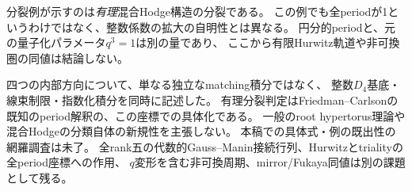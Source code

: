 分裂例が示すのは\emph{有理}混合Hodge構造の分裂である。
この例でも全periodが1というわけではなく、整数係数の拡大の自明性とは異なる。
円分的periodと、元の量子化パラメータ$q^3=1$は別の量であり、
ここから有限Hurwitz軌道や非可換圏の同値は結論しない。

\begin{remark}[現在到達した範囲]
四つの内部方向について、単なる独立なmatching積分ではなく、
整数$D_4$基底・線束制限・指数化積分を同時に記述した。
有理分裂判定はFriedman--Carlsonの既知のperiod解釈の、この座標での具体化である。
一般のroot hypertorus理論や混合Hodgeの分類自体の新規性を主張しない。
本稿での具体式・例の既出性の網羅調査は未了。
全rank五の代数的Gauss--Manin接続行列、Hurwitzとtrialityの全period座標への作用、
$q$変形を含む非可換周期、mirror/Fukaya同値は別の課題として残る。
\end{remark}
